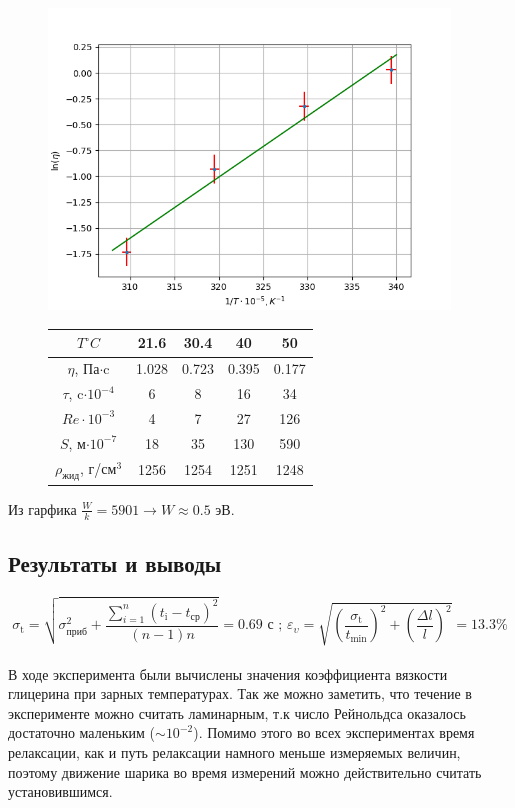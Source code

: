 \begin{figure}[!h]
    \centering
    \begin{minipage}{0.42\textwidth}
        \includegraphics[height=8cm]{plot.png}
    \end{minipage}
    \hfill
    \begin{minipage}{0.42\textwidth}
        \centering
        \begin{tabular}{|c|c|c|c|c|}
            \hline 
            $T^{\circ}C$ & 21.6& 30.4& 40& 50\\\hline
            $\eta$, Па$\cdot$c &1.028 & 0.723 & 0.395 & 0.177\\\hline
            $\tau$, c$\cdot 10^{-4}$ & 6 & 8 & 16 & 34\\\hline
            $Re \cdot 10^{-3}$ & 4 & 7 & 27 & 126\\\hline
            $S$, м$\cdot 10^{-7}$ & 18 & 35 & 130 & 590\\\hline
            $\rho_{\text{жид}}$, г/см$^3$ & 1256 & 1254 & 1251 & 1248\\\hline
        \end{tabular}
    \end{minipage}
\end{figure}
Из гарфика $\frac{W}{k} = 5901 \rightarrow W \approx 0.5$ эВ.\\

\subsection*{Результаты и выводы}
$$\sigma_{\text{t}} = \sqrt{\sigma_{\text{приб}}^2 + \frac{\sum_{i=1}^{n} (t_{\text{i}} - t_{\text{ср}})^2}{(n-1)n}} = 0.69\text{ с ; }
    \varepsilon_{\upsilon} = \sqrt{\left (\frac{\sigma_{\text{t}}}{t_{\text{min}}}\right )^2 + \left (\frac{\Delta l}{l}\right )^2} = 13.3 \%  $$
\\
В ходе эксперимента были вычислены значения коэффициента вязкости 
глицерина при зарных температурах. Так же можно заметить, что течение в эксперименте 
можно считать ламинарным, т.к число Рейнольдса оказалось достаточно маленьким ($\sim 10^{-2}$). 
Помимо этого во всех экспериментах время релаксации, как и путь релаксации намного 
меньше измеряемых величин, поэтому движение шарика во время измерений можно 
действительно считать установившимся. 



